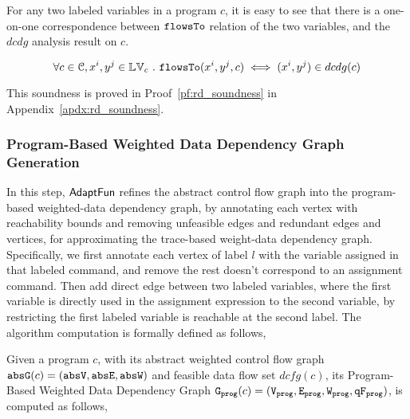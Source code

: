    For any two labeled variables in a program $c$, it is easy to see that there is a one-on-one correspondence between 
   $\mathtt{flowsTo}$ relation of the two variables, and the $dcdg$ analysis result on $c$.
   \begin{thm}
   \label{thm:rd_soundness}
   \[
   \forall c \in \mathcal{C}, x^i, y^j \in \mathbb{LV}_c ~.~ 
   \mathtt{flowsTo}(x^i, y^j, c) \iff (x^i, y^j) \in dcdg(c)
   \]
   \end{thm}
   This soundness is proved in Proof~\ref{pf:rd_soundness} in Appendix~\ref{apdx:rd_soundness}.
   \subsubsection{Program-Based Weighted Data Dependency Graph Generation}
   In this step, $\textsf{AdaptFun}$ refines the abstract control flow graph into the program-based weighted-data dependency graph, 
by annotating each vertex with reachability bounds and 
removing unfeasible edges and redundant edges and vertices,
for approximating the trace-based weight-data dependency graph.
\\
Specifically, we first annotate each vertex of label $l$ with the variable 
assigned in that labeled command, and remove the rest doesn't correspond to an assignment command.
Then 
add direct edge between two labeled variables,
where the first variable 
is directly used in the assignment expression to the second variable, by restricting 
the first labeled variable is reachable at the second label.
The algorithm computation is formally defined as follows,
\begin{defn}
\label{def:analyz_dcfg}
Given a program $c$, with its abstract weighted control flow graph $\mathtt{abs}{\mathtt{G}}(c) = (\mathtt{abs}{\mathtt{V}}, \mathtt{abs}{\mathtt{E}}, \mathtt{abs}{\mathtt{W}})$ and 
feasible data flow set $dcfg(c)$, its Program-Based Weighted Data Dependency Graph
$\mathtt{{G_{prog}}}(c) = (\mathtt{{V_{prog}}}, \mathtt{{E_{prog}}}, \mathtt{{W_{prog}}}, \mathtt{{qF_{prog}}})$,
is computed as follows,
\\
\end{defn}

